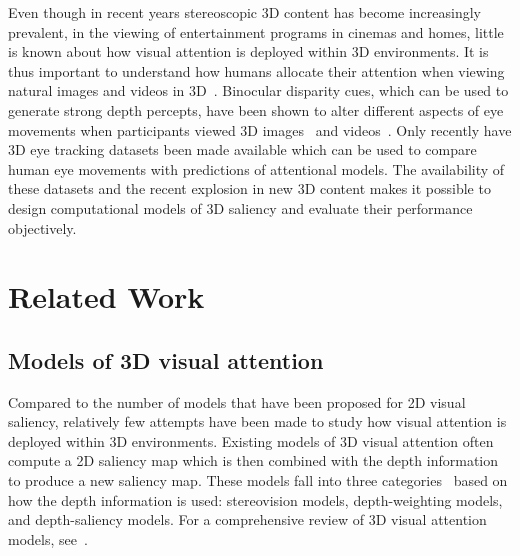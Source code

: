 Even though in recent years stereoscopic 3D content has become increasingly prevalent, \eg in the viewing of entertainment programs in cinemas and homes, little is known about how visual attention is deployed within 3D environments. It is thus important to understand how humans allocate their attention when viewing natural images and videos in 3D~\citep{LeCallet_Niebur13}. Binocular disparity cues, which can be used to generate strong depth percepts, have been shown to alter different aspects of eye movements when participants viewed 3D images~\citep{Jansen_etal09} and videos~\citep{Huynh_Schiatti11}. Only recently have 3D eye tracking datasets been made available which can be used to compare human eye movements with predictions of attentional models. The availability of these datasets and the recent explosion in new 3D content makes it possible to design computational models of 3D saliency and evaluate their performance objectively.


\section{Related Work}
\subsection{Models of 3D visual attention}
Compared to the number of models that have been proposed for 2D visual saliency, relatively few attempts have been made to study how visual attention is deployed within 3D environments. Existing models of 3D visual attention often compute a 2D saliency map which is then combined with the depth information to produce a new saliency map. These models fall into three categories~\citep{Wang_etal13} based on how the depth information is used: stereovision models, depth-weighting models, and depth-saliency models. For a comprehensive review of 3D visual attention models, see~\cite{Wang_etal13,Ma_Hang15}.

